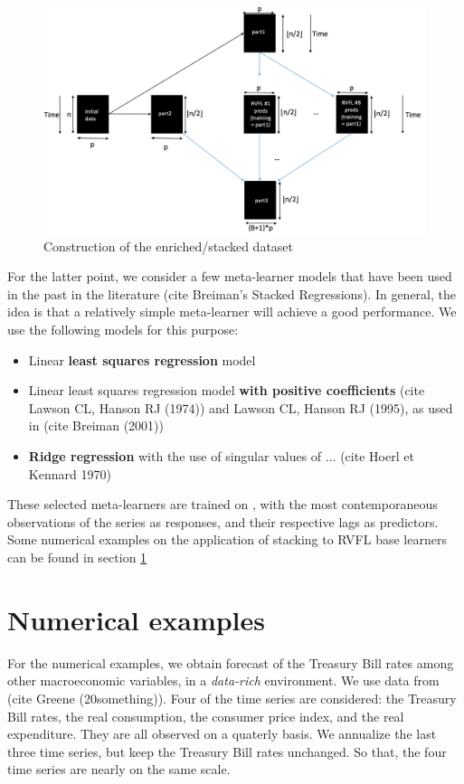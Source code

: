 \begin{figure}[!htb]
\centering
\includegraphics[width=14cm]{gfx/chapter-rvfl-ensembles/rvfl_stacking.png}
\caption{Construction of the enriched/stacked dataset}
\label{rvfl_stacking_plot}
\end{figure}


For the latter point, we consider a few meta-learner models that have been used in the past in the literature (cite Breiman's Stacked Regressions). In general, the idea is that a relatively simple meta-learner will achieve a good performance. We use the following models for this purpose:
\begin{itemize}
\item Linear \textbf{least squares regression} model
\item Linear least squares regression model \textbf{with positive coefficients} (cite Lawson CL, Hanson RJ (1974)) and Lawson CL, Hanson RJ (1995), as used in (cite Breiman (2001))
\item \textbf{Ridge regression} with the use of singular values of $\ldots$ (cite Hoerl et Kennard 1970)
\end{itemize}

These selected meta-learners are trained on , with the most contemporaneous observations of the series as responses, and their respective lags as predictors. Some numerical examples on the application of stacking to RVFL base learners can be found in section \ref{sec:numericalexamples}

\section{Numerical examples}
\label{sec:numericalexamples}

For the numerical examples, we obtain forecast of the Treasury Bill rates among other macroeconomic variables, in a \textit{data-rich} environment. We use data from (cite Greene (20something)). Four of the time series are considered: the Treasury Bill rates, the real consumption, the consumer price index, and the real expenditure. They are all observed on a quaterly basis. We annualize the last three time series, but keep the Treasury Bill rates unchanged. So that, the four time series are nearly on the same scale.

